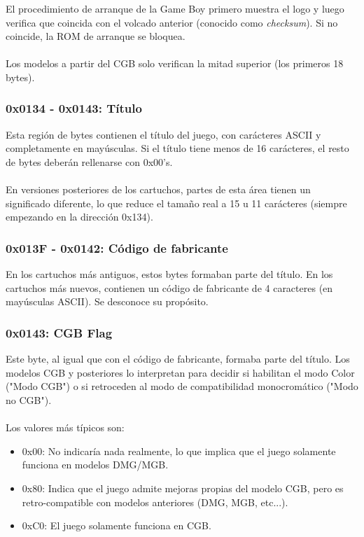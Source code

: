 El procedimiento de arranque de la Game Boy primero muestra el logo y luego verifica que coincida con el volcado anterior (conocido como \textit{checksum}). Si no coincide, la ROM de arranque se bloquea.
\\\\
Los modelos a partir del CGB solo verifican la mitad superior (los primeros 18 bytes).

\subsubsection{0x0134 - 0x0143: Título}
Esta región de bytes contienen el título del juego, con carácteres ASCII y completamente en mayúsculas. Si el título tiene menos de 16 carácteres, el resto de bytes deberán rellenarse con 0x00's. 
\\\\
En versiones posteriores de los cartuchos, partes de esta área tienen un significado diferente, lo que reduce el tamaño real a 15 u 11 carácteres (siempre empezando en la dirección 0x134).

\subsubsection{0x013F - 0x0142: Código de fabricante}

En los cartuchos más antiguos, estos bytes formaban parte del título. En los cartuchos más nuevos, contienen un código de fabricante de 4 caracteres (en mayúsculas ASCII). Se desconoce su propósito.

\subsubsection{0x0143: CGB Flag}
Este byte, al igual que con el código de fabricante, formaba parte del título. Los modelos CGB y posteriores lo interpretan para decidir si habilitan el modo Color ("Modo CGB") o si retroceden al modo de compatibilidad monocromático ("Modo no CGB").
\\\\
Los valores más típicos son: 
\begin{itemize}
    \item 0x00: No indicaría nada realmente, lo que implica que el juego solamente funciona en modelos DMG/MGB.
    \item 0x80: Indica que el juego admite mejoras propias del modelo CGB, pero es retro-compatible con modelos anteriores (DMG, MGB, etc...).
    \item 0xC0: El juego solamente funciona en CGB.
\end{itemize}

